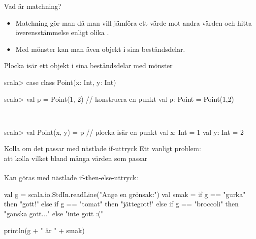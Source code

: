 \begin{Slide}{Vad är matchning?}

  \begin{itemize}
    \item Matchning gör man då man vill jämföra ett värde mot andra värden och hitta överensstämmelse  enligt olika .
    \item Med mönster kan man även  objekt i sina beståndsdelar.
  \end{itemize}
\end{Slide}

\begin{Slide}{Plocka isär ett objekt i sina beståndsdelar med mönster}

\begin{REPLnonum}
scala> case class Point(x: Int, y: Int)

scala> val p = Point(1, 2)      // konstruera en punkt
val p: Point = Point(1,2)
\end{REPLnonum}

\pause 

~\\
\begin{REPLnonum}
scala> val Point(x, y) = p      // plocka isär en punkt
val x: Int = 1
val y: Int = 2
  
\end{REPLnonum}
\end{Slide}


\begin{Slide}{Kolla om det passar med nästlade if-uttryck}
Ett vanligt problem: \\ att kolla vilket bland många värden som passar \\~\\

Kan göras med nästlade if-then-else-uttryck:

\begin{Code}
val g = scala.io.StdIn.readLine("Ange en grönsak:")
val smak =
  if g == "gurka" then "gott!"
  else if g == "tomat" then "jättegott!"
  else if g == "broccoli" then "ganska gott..."
  else "inte gott :("

println(g + " är " + smak)
\end{Code}
      
\end{Slide}


